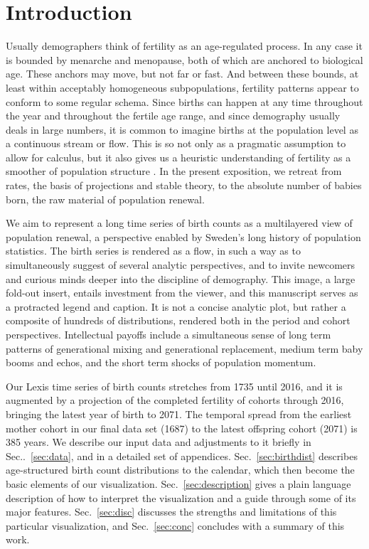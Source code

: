 \documentclass{article}
\begin{document}
\pagebreak
\section{Introduction}
Usually demographers think of fertility as an age-regulated process. In any case it is bounded by menarche and menopause, both of which are anchored to biological age. These anchors may move, but not far or fast. And between these bounds, at least within acceptably homogeneous subpopulations, fertility patterns appear to conform to some regular schema. Since births can happen at any time throughout the year and throughout the fertile age range, and since demography usually deals in large numbers, it is common to imagine births at the population level as a continuous stream or flow. This is so not only as a pragmatic assumption to allow for calculus, but it also gives us a heuristic understanding of fertility as a smoother of population structure \citep{arthur1982ergodic}. In the present exposition, we retreat from rates, the basis of projections and stable theory, to the absolute number of babies born, the raw material of population renewal. 

We aim to represent a long time series of birth counts as a multilayered view of population renewal, a perspective enabled by Sweden's long history of population statistics. The birth series is rendered as a flow, in such a way as to simultaneously suggest of several analytic perspectives, and to invite newcomers and curious minds deeper into the discipline of demography. This image, a large fold-out insert, entails investment from the viewer, and this manuscript serves as a protracted legend and caption. It is not a concise analytic plot, but rather a composite of hundreds of distributions, rendered both in the period and cohort perspectives. Intellectual payoffs include a simultaneous sense of long term patterns of generational mixing and generational replacement, medium term baby booms and echos, and the short term shocks of population momentum. %

Our Lexis time series of birth counts stretches from 1735 until 2016, and it is augmented by a projection of the completed fertility of cohorts through 2016, bringing the latest year of birth to 2071. The temporal spread from the earliest mother cohort in our final data set (1687) to the latest offspring cohort (2071) is 385 years. We describe our input data and adjustments to it briefly in Sec..~\ref{sec:data}, and in a detailed set of appendices. Sec.~\ref{sec:birthdist} describes age-structured birth count distributions to the calendar, which then become the basic elements of our visualization. Sec.~\ref{sec:description} gives a plain language description of how to interpret the visualization and a guide through some of its major features. Sec.~\ref{sec:disc} discusses the strengths and limitations of this particular visualization, and Sec.~\ref{sec:conc} concludes with a summary of this work.
\end{document}
